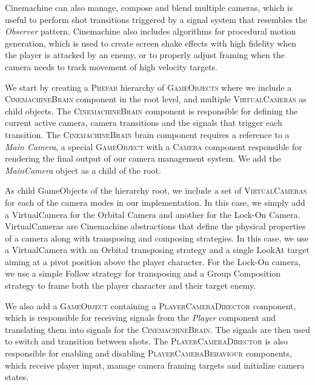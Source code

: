 Cinemachine can also manage, compose and blend multiple cameras, which is useful to perform shot transitions triggered by a signal system that resembles the \emph{Observer} pattern. Cinemachine also includes algorithms for procedural motion generation, which is used to create screen shake effects with high fidelity when the player is attacked by an enemy, or to properly adjust framing when the camera needs to track movement of high velocity targets.

We start by creating a \textsc{Prefab} hierarchy of \textsc{GameObjects} where we include a \textsc{CinemachineBrain} component in the root level, and multiple \textsc{VirtualCameras} as child objects. The \textsc{CinemachineBrain} component is responsible for defining the current active camera, camera transitions and the signals that trigger each transition. The \textsc{CinemachineBrain} brain component requires a reference to a \emph{Main Camera}, a special \textsc{GameObject} with a \textsc{Camera} component responsible for rendering the final output of our camera management system. We add the \emph{MainCamera} object as a child of the root.

As child GameObjects of the hierarchy root, we include a set of \textsc{VirtualCameras} for each of the camera modes in our implementation. In this case, we simply add a VirtualCamera for the Orbital Camera and another for the Lock-On Camera. VirtualCameras are Cinemachine abstractions that define the physical properties of a camera along with transposing and composing strategies. In this case, we use a VirtualCamera with an Orbital transposing strategy and a single LookAt target aiming at a pivot position above the player character. For the Lock-On camera, we use a simple Follow strategy for transposing and a Group Composition strategy to frame both the player character and their target enemy.

We also add a \textsc{GameObject} containing a \textsc{PlayerCameraDirector} component, which is responsible for receiving signals from the \emph{Player} component and translating them into signals for the \textsc{CinemachineBrain}. The signals are then used to switch and transition between shots. The \textsc{PlayerCameraDirector} is also responsible for enabling and disabling \textsc{PlayerCameraBehaviour} components, which receive player input, manage camera framing targets and initialize camera states.

